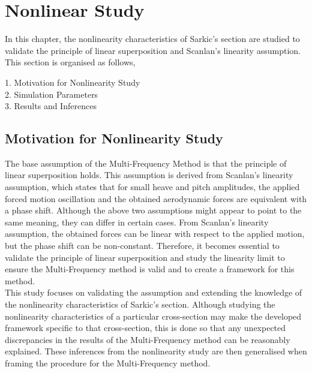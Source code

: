 \documentclass[a4paper, 12pt]{report}
\begin{document}
\chapter*{Nonlinear Study}

In this chapter, the nonlinearity characteristics of Sarkic's section are studied to validate the principle of 
linear superposition and Scanlan's linearity assumption. This section is organised as follows, \\

\begin{flushleft}
\hspace{2cm}1. Motivation for Nonlinearity Study \\
\hspace{2cm}2. Simulation Parameters \\
\hspace{2cm}3. Results and Inferences \\
\end{flushleft}

\section{Motivation for Nonlinearity Study}

The base assumption of the Multi-Frequency Method is that the principle of linear superposition holds. 
This assumption is derived from Scanlan's linearity assumption, which states that for small heave and pitch amplitudes, 
the applied forced motion oscillation and the obtained aerodynamic forces are equivalent with a phase 
shift. Although the above two assumptions might appear to point to the same meaning, they can differ in 
certain cases. From Scanlan's linearity assumption, the obtained forces can be linear with respect to 
the applied motion, but the phase shift can be non-constant. 
Therefore, it becomes essential to validate the principle of linear superposition and study the 
linearity limit to ensure the Multi-Frequency method is valid and to create a framework for this method. \\

This study focuses on validating the assumption and extending the knowledge of the nonlinearity characteristics 
of Sarkic's section. Although studying the nonlinearity characteristics of a particular cross-section may make 
the developed framework specific to that cross-section, this is done so that any unexpected discrepancies 
in the results of the Multi-Frequency method can be reasonably explained. These inferences from the nonlinearity study are then generalised 
when framing the procedure for the Multi-Frequency method.\\
\end{document}
